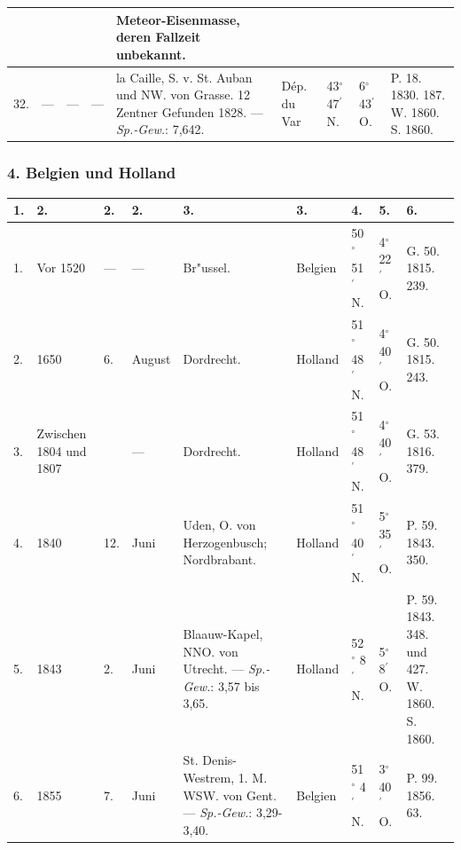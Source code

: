 \documentclass[a4paper, 8pt, oneside, polutonikogreek, german]{article}
\begin{document}
\begin{center}
\begin{longtable}{|p{3mm}|p{12mm}|p{5mm}|p{16mm}|p{25mm}|p{17mm}|p{13mm}|p{13mm}|p{13mm}|}
         & & & & Meteor-Eisenmasse, deren Fallzeit unbekannt. & & & & \\ \hline
        32. & --- & --- & --- & la Caille, S. v. St. Auban und NW. von Grasse. 12 Zentner Gefunden 1828. --- \emph{Sp.-Gew.}: 7,642. & Dép. du Var & 43$^\circ$ 47$^\prime$ N. & 6$^\circ$ 43$^\prime$ O. & P. 18. 1830. 187. W. 1860. S. 1860. \\ \hline
    \end{longtable}
\end{center}
\subsubsection{4. Belgien und Holland}
\begin{table}[H]
    \centering
    \footnotesize
    \begin{longtable}{|p{3mm}|p{10mm}|p{5mm}|p{9mm}|p{25mm}|p{13mm}|p{11mm}|p{11mm}|p{18mm}|}
    \hline
        1. & 2. & 2. & 2. & 3. & 3. & 4. & 5. & 6. \\ \hline
        1. & Vor 1520 & --- & --- & Br"ussel. & Belgien & 50$^\circ$ 51$^\prime$ N. & 4$^\circ$ 22$^\prime$ O. & G. 50. 1815. 239. \\ \hline
        2. & 1650 & 6. & August & Dordrecht. & Holland & 51$^\circ$ 48$^\prime$ N. & 4$^\circ$ 40$^\prime$ O. & G. 50. 1815. 243. \\ \hline
        3. & Zwischen 1804 und 1807 & ~ & --- & Dordrecht. & Holland & 51$^\circ$ 48$^\prime$ N. & 4$^\circ$ 40$^\prime$ O. & G. 53. 1816. 379. \\ \hline
        4. & 1840 & 12. & Juni & Uden, O. von Herzogenbusch; Nordbrabant. & Holland & 51$^\circ$ 40$^\prime$ N. & 5$^\circ$ 35$^\prime$ O. & P. 59. 1843. 350. \\ \hline
        5. & 1843 & 2. & Juni & Blaauw-Kapel, NNO. von Utrecht. --- \emph{Sp.-Gew.}: 3,57 bis 3,65. & Holland & 52$^\circ$ 8$^\prime$ N. & 5$^\circ$ 8$^\prime$ O. & P. 59. 1843. 348. und 427. W. 1860. S. 1860. \\ \hline
        6. & 1855 & 7. & Juni & St. Denis-Westrem, 1. M. WSW. von Gent. --- \emph{Sp.-Gew.}: 3,29-3,40. & Belgien & 51$^\circ$ 4$^\prime$ N. & 3$^\circ$ 40$^\prime$ O. & P. 99. 1856. 63. \\ \hline
    \end{longtable}
\end{table}
\end{document}
